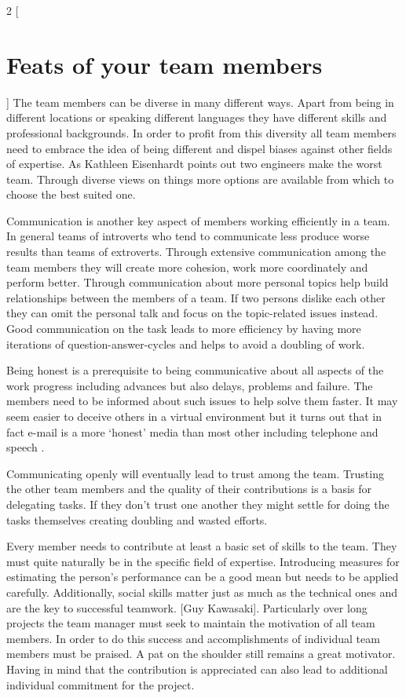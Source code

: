 \begin{multicols}{2}
[\section{Feats of your team members}]
The team members can be diverse in many different ways. Apart from being in different locations or speaking different languages they have different skills and professional backgrounds. In order to profit from this diversity all team members need to embrace the idea of being different and dispel biases against other fields of expertise. As Kathleen Eisenhardt points out two engineers make the worst team. Through diverse views on things more options are available from which to choose the best suited one.

Communication is another key aspect of members working efficiently in a team. In general teams of introverts who tend to communicate less  produce worse results than teams of extroverts. Through extensive communication among the team members they will create more cohesion, work more coordinately and perform better. Through communication about more personal topics help build relationships between the members of a team. If two persons dislike each other they can omit the personal talk and focus on the topic-related issues instead.
Good communication on the task leads to more efficiency by having more iterations of question-answer-cycles and helps to avoid a doubling of work.

Being honest is a prerequisite to being communicative about all aspects of the work progress including advances but also delays, problems and failure. The members need to be informed about such issues to help solve them faster. It may seem easier to deceive others in a virtual environment but it turns out that in fact e-mail is a more ‘honest’ media than most other including telephone and speech \cite{TED}.

Communicating openly will eventually lead to trust among the team. Trusting the other team members and the quality of their contributions is a basis for delegating tasks. If they don’t trust one another they might settle for doing the tasks themselves creating doubling and wasted efforts.

Every member needs to contribute at least a basic set of skills to the team. They must quite naturally be in the specific field of expertise. Introducing measures for estimating the person’s performance can be a good mean but needs to be applied carefully. Additionally, social skills matter just as much as the technical ones and are the key to  successful teamwork. [Guy Kawasaki].
Particularly over long projects the team manager must seek to maintain the motivation of all team members. In order to do this success and accomplishments of individual team members must be praised. A pat on the shoulder still remains a great motivator. Having in mind that the contribution is appreciated can also lead to additional individual commitment  for the project.


\end{multicols}
